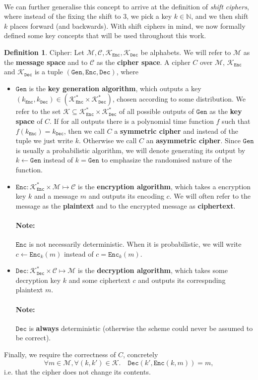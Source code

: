 \documentclass{article}
\theoremstyle{definition}
\newtheorem{definition}{Definition}[section]
\newcommand{\Enc}{\texttt{Enc}}
\newcommand{\Dec}{\texttt{Dec}}
\newcommand{\Gen}{\texttt{Gen}}
\newcommand{\M}{\mathcal{M}}
\renewcommand{\C}{\mathcal{C}}
\newcommand{\K}{\mathcal{K}}
\begin{document}
\paragraph{}
We can further generalise this concept to arrive at the definition of
\textit{shift ciphers}, where instead of the fixing the shift to 3, we pick a
key $k \in \mathbb{N}$, and we then shift $k$ places forward (and backwards).
With shift ciphers in mind, we now formally defined some key concepts that will
be used throughout this work.
\begin{definition}{Cipher:}
  Let $\M, \C, \K_\Enc, \K_\Dec$ be alphabets. We will refer to $\M$
  as the \textbf{message space} and to $\C$ as the \textbf{cipher space}.
  A cipher $C$ over $\M$, $\K_\Enc$ and $\K_\Dec$ is a tuple $(\Gen, \Enc, \Dec)$, where
  \begin{itemize}
  \item $\Gen$ is the \textbf{key generation algorithm}, which outputs a key
    $(k_\Enc, k_\Dec) \in (\K_\Enc^* \times \K_\Dec^*)$, chosen according to some
    distribution. We refer to the set $\K\subseteq \K_\Enc^* \times \K_\Dec^*$ of all possible outputs of $\Gen$ as the
    \textbf{key space} of $C$. If for all outputs there is a polynomial time
    function $f$ such that $f(k_\Enc) = k_\Dec$, then we call $C$
    a \textbf{symmetric cipher} and instead of the tuple we just write $k$.
    Otherwise we call $C$ an \textbf{asymmetric cipher}.
    Since $\Gen$ is usually a probabilistic algorithm, we will denote generating
    its output by $k \leftarrow \Gen$ instead of $k = \Gen$ to emphasize the
    randomised nature of the function.
  \item $\Enc: \K_\Enc^*\times\M\mapsto \C$ is the \textbf{encryption algorithm}, which takes
    a encryption key $k$ and a message $m$ and outputs its encoding $c$. We will often
    refer to the message as the \textbf{plaintext} and to the encrypted message
    as \textbf{ciphertext}.
    \paragraph{Note:} $\Enc$ is not necessarily deterministic. When it is
    probabilistic, we will write $c \leftarrow \Enc_k(m)$ instead of $c = \Enc_k(m)$.
  \item $\Dec: \K_\Dec^*\times\C \mapsto \M$ is the \textbf{decryption algorithm}, which
    takes some decryption key $k$ and some ciphertext $c$ and outputs its
    correspnding plaintext $m$. 
    \paragraph{Note:} $\Dec$ is \textbf{always} deterministic (otherwise the
    scheme could never be assumed to be correct).
  \end{itemize}
  Finally, we require the correctness of $C$, concretely
  \[
    \forall m \in \M, \forall (k, k') \in \K. \quad \Dec(k', \Enc(k, m)) = m,
  \]
  i.e. that the cipher does not change its contents.
\end{definition}
\end{document}
